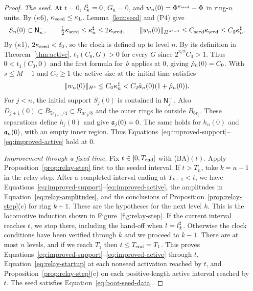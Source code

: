 \begin{proof}
\emph{The seed.}
At $t=0$, $t^\sharp_n=0$, $G_n=0$, and $w_n(0)=\Phi^{\kappa_{\mathrm{seed}}}-\Phi$ in ring-$n$
units. By ($\kappa$6), $\kappa_{\mathrm{seed}}\le\kappa_{\mathrm{L}}$. Lemma~\ref{lem:seed} and (P4) give
\begin{equation}
\label{eq:boot-seed-data}
S_n(0)\subset\mathsf{N}^{-}_n,\qquad
\tfrac12\kappa_{\mathrm{seed}}\le\kappa^\sharp_n\le2\kappa_{\mathrm{seed}},\qquad
\|w_n(0)\|_{H^{M-1}}\le C_{\mathrm{seed}}\kappa_{\mathrm{seed}}\le C_0\kappa^\sharp_n.
\end{equation}
By ($\kappa$1), $2\kappa_{\mathrm{seed}}<\delta_0$, so the clock is defined up to level $n$.
By its definition in Theorem~\ref{thm:active}, $t_1(C_0,G)>0$ for every $G$
since $2^{3/2}C_0>1$. Thus $0<t_1(C_0,0)$ and the first formula for
$\hat\rho$ applies at $0$, giving $\hat\rho_n(0)=C_0$.
With $s\le M-1$ and $C_2\ge1$ the
active size at the initial time satisfies
\begin{equation}
\label{eq:boot-start}
\|w_n(0)\|_{H^s}\le C_0\kappa^\sharp_n
<C_2\hat a_n(0)(1+\hat\rho_n(0)).
\end{equation}
For $j<n$, the initial support $S_j(0)$ is contained in $\mathsf{N}^{-}_j$. Also
$D_{j+1}(0)\subset\overline B_{5r_{j+1}/4}\subset B_{ar_j/8}$ and the outer
rings lie outside $B_{6r_j}$. These separations define $h_j(0)$ and give
$\mathfrak{a}_j(0)=0$. The same holds for $h_n(0)$ and $\mathfrak{a}_n(0)$, with an empty
inner region. Thus Equations~\eqref{eq:improved-support}--\eqref{eq:improved-active}
hold at $0$.

\emph{Improvement through a fixed time.}
Fix $t\in[0,T_{\mathrm{end}}]$ with (BA)$(t)$. Apply Proposition~\ref{prop:relay-step}
first to the seeded interval. If $t>T_n$, take $k=n-1$ in the relay step.
After a completed interval ending at $T_{k+1}<t$, we have
Equations~\eqref{eq:improved-support}--\eqref{eq:improved-active}, the amplitudes
in Equation~\eqref{eq:relay-amplitudes}, and the conclusions of
Proposition~\ref{prop:relay-step}(c) for ring $k+1$. These are the hypotheses
for the next level $k$. This is the locomotive induction
shown in Figure~\ref{fig:relay-step}. If the current interval reaches
$t$, we stop there, including the hand-off when $t=t^\sharp_k$. Otherwise the
clock conditions have been verified
through $k$ and we proceed to $k-1$. There are at most $n$ levels, and if
we reach $T_1$ then $t\le T_{\mathrm{end}}=T_1$. This proves
Equations~\eqref{eq:improved-support}--\eqref{eq:improved-active} through $t$,
Equation~\eqref{eq:relay-startup} at each nonseed activation reached by $t$,
and Proposition~\ref{prop:relay-step}(c) on each positive-length active
interval reached by $t$. The seed satisfies Equation~\eqref{eq:boot-seed-data}.


\end{proof}
